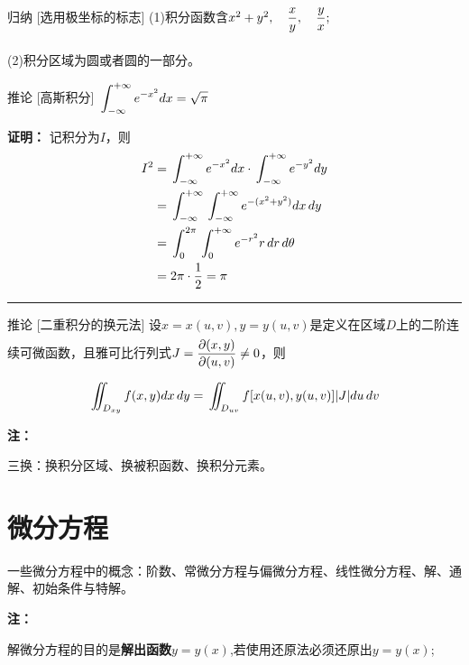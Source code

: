 \documentclass[a4paper,12pt,oneside,fontset=none]{ctexbook}
\let\olddfrac\dfrac
\renewcommand{\dfrac}[2]{
    \olddfrac{#1\vrule width 0pt height 1.15em depth 0em}{#2\vrule width 0pt height 0em depth 0.6em}
}
\let\oldint\int
\renewcommand{\int}{\displaystyle{\vrule width 0pt height 0em depth 0em}\oldint}
\let\oldiint\iint
\renewcommand{\iint}{\displaystyle{\vrule width 0pt height 0em depth 0em}\oldiint}
\newenvironment{corollary}[1][]{\begin{thmBox}{推论}{#1}}{\end{thmBox}}
\newenvironment{induction}[1][]{\begin{thmBox}{归纳}{#1}}{\end{thmBox}}
\newenvironment{note}{
    \par\vspace{0.5em}\noindent
    \textbf{\color{NoteColor} 注：}
}{
    \par\vspace{0.5em}
}
\renewenvironment{proof}{
    \par\vspace{0.5em}\noindent
    \textbf{\color{LogicColor} 证明：}
}{
    \hfill \textcolor{LogicColor}{\rule{0.6em}{0.6em}} \par
}
\numberwithin{equation}{chapter}
\begin{document}
\begin{induction}
    [选用极坐标的标志]
    (1)积分函数含$x^2+y^2,\quad \dfrac{x}{y},\quad \dfrac{y}{x};$
    
    (2)积分区域为圆或者圆的一部分。
\end{induction}

\begin{corollary}
    [高斯积分]
    $\int_{-\infty}^{+\infty}e^{-x^2} dx = \sqrt{\pi}$
\end{corollary}
\begin{proof}记积分为$I$，则
    \begin{align*}
        I^2 &= \int_{-\infty}^{+\infty}e^{-x^2} dx\cdot \int_{-\infty}^{+\infty}e^{-y^2} dy \\
        &= \int_{-\infty}^{+\infty}\int_{-\infty}^{+\infty} e^{-(x^2+y^2)} dx\, dy \\
        &= \int_0^{2\pi}\int_0^{+\infty} e^{-r^2} r\, dr\, d\theta \\
        &= 2\pi \cdot \frac{1}{2} = \pi
    \end{align*}
\end{proof}

\begin{corollary}
    [二重积分的换元法]
    设$x=x(u,v), y=y(u,v)$是定义在区域$D$上的二阶连续可微函数，且雅可比行列式$J=\dfrac{\partial(x,y)}{\partial(u,v)}\neq 0$，则
    $$\iint_{D_{xy}} f(x,y) dx\, dy = \iint_{D_{uv}} f[x(u,v), y(u,v)] |J| du\, dv$$
\end{corollary}
\begin{note}
    三换：换积分区域、换被积函数、换积分元素。
\end{note}



\chapter{微分方程}

一些微分方程中的概念：阶数、常微分方程与偏微分方程、线性微分方程、解、通解、初始条件与特解。
\begin{note}
    解微分方程的目的是\textbf{解出函数$y=y(x)$},若使用还原法必须还原出$y=y(x)$;
\end{note}
\end{document}
